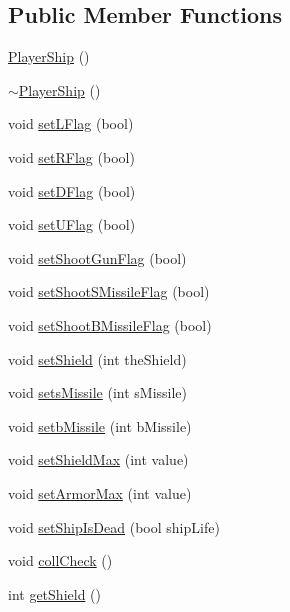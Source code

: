 \subsection*{Public Member Functions}
\begin{DoxyCompactItemize}
\item 
\hyperlink{class_player_ship_a7e4ea77e9ad9182c6277575d82366719}{PlayerShip} ()
\item 
\hyperlink{class_player_ship_a167478327150c2a6e12539fcfabe8d6c}{$\sim$PlayerShip} ()
\item 
void \hyperlink{class_player_ship_a52c30b5039d38b1d285fbc65689b377b}{setLFlag} (bool)
\item 
void \hyperlink{class_player_ship_a56bef96439b3cd3e061b391808ec2e98}{setRFlag} (bool)
\item 
void \hyperlink{class_player_ship_afa576113093b15958d5b64bea60c302a}{setDFlag} (bool)
\item 
void \hyperlink{class_player_ship_ac49a1a6d117dc84b84c8c6b3ad1ecd83}{setUFlag} (bool)
\item 
void \hyperlink{class_player_ship_a01ccc6b6aeb1a8633ebf4caeab995ff6}{setShootGunFlag} (bool)
\item 
void \hyperlink{class_player_ship_a445b0862199571801e5b3f62b1439b67}{setShootSMissileFlag} (bool)
\item 
void \hyperlink{class_player_ship_a9bab47afe26e4a08171c07043670905b}{setShootBMissileFlag} (bool)
\item 
void \hyperlink{class_player_ship_a2d736a12bc12fa351810aea18ccd1433}{setShield} (int theShield)
\item 
void \hyperlink{class_player_ship_a69f905cfd109b61000c2eaccb1741fae}{setsMissile} (int sMissile)
\item 
void \hyperlink{class_player_ship_a83a451bcbd09a63094402ba83e73db2a}{setbMissile} (int bMissile)
\item 
void \hyperlink{class_player_ship_a26c3da7df2435e3d6b114db177ea1e92}{setShieldMax} (int value)
\item 
void \hyperlink{class_player_ship_af7378ca18726f28160c2ac30d091c9b8}{setArmorMax} (int value)
\item 
void \hyperlink{class_player_ship_aa5d50b87e6af5b579e851dd216cee0f3}{setShipIsDead} (bool shipLife)
\item 
void \hyperlink{class_player_ship_a9c3745489576a8c3027b9e17ac2046fb}{collCheck} ()
\item 
int \hyperlink{class_player_ship_a84fda0bb0ef416d7bcf04f4e3a89c181}{getShield} ()

\end{DoxyCompactItemize}
